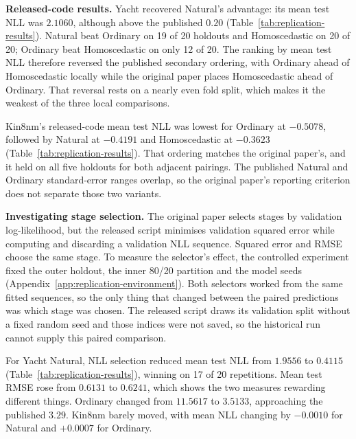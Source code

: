 \textbf{Released-code results.}
Yacht recovered Natural's advantage: its mean test NLL was $2.1060$, although above the published $0.20$ (Table~\ref{tab:replication-results}).
Natural beat Ordinary on 19 of 20 holdouts and Homoscedastic on 20 of 20; Ordinary beat Homoscedastic on only 12 of 20.
The ranking by mean test NLL therefore reversed the published secondary ordering, with Ordinary ahead of Homoscedastic locally while the original paper places Homoscedastic ahead of Ordinary.
That reversal rests on a nearly even fold split, which makes it the weakest of the three local comparisons.

Kin8nm's released-code mean test NLL was lowest for Ordinary at $-0.5078$, followed by Natural at $-0.4191$ and Homoscedastic at $-0.3623$ (Table~\ref{tab:replication-results}).
That ordering matches the original paper's, and it held on all five holdouts for both adjacent pairings.
The published Natural and Ordinary standard-error ranges overlap, so the original paper's reporting criterion does not separate those two variants.

\textbf{Investigating stage selection.}
The original paper selects stages by validation log-likelihood, but the released script minimises validation squared error while computing and discarding a validation NLL sequence.
Squared error and RMSE choose the same stage.
To measure the selector's effect, the controlled experiment fixed the outer holdout, the inner 80/20 partition and the model seeds (Appendix~\ref{app:replication-environment}).
Both selectors worked from the same fitted sequences, so the only thing that changed between the paired predictions was which stage was chosen.
The released script draws its validation split without a fixed random seed and those indices were not saved, so the historical run cannot supply this paired comparison.

For Yacht Natural, NLL selection reduced mean test NLL from $1.9556$ to $0.4115$ (Table~\ref{tab:replication-results}), winning on 17 of 20 repetitions.
Mean test RMSE rose from $0.6131$ to $0.6241$, which shows the two measures rewarding different things.
Ordinary changed from $11.5617$ to $3.5133$, approaching the published $3.29$.
Kin8nm barely moved, with mean NLL changing by $-0.0010$ for Natural and $+0.0007$ for Ordinary.

